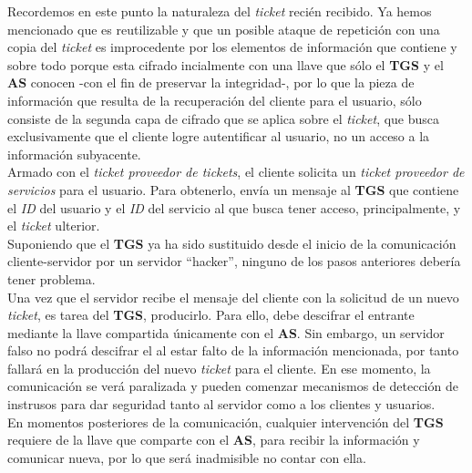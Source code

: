 \documentclass[12pt]{article}
\begin{document}
Recordemos en este punto la naturaleza del \textit{ticket} recién recibido. Ya hemos mencionado que es reutilizable y que un posible ataque de repetición con una copia del \textit{ticket} es improcedente por los elementos de información que contiene y sobre todo porque esta cifrado incialmente con una llave que sólo el \textbf{TGS} y el \textbf{AS} conocen -con el fin de preservar la integridad-, por lo que
la pieza de información que resulta de la recuperación del cliente para el usuario, sólo consiste de
la segunda capa de cifrado que se aplica sobre el \textit{ticket}, que busca exclusivamente que el
cliente logre autentificar al usuario, no un acceso a la información subyacente. \\

Armado con el \textit{ticket proveedor de tickets}, el cliente solicita un \textit{ticket proveedor de servicios} para el usuario. Para obtenerlo, envía un mensaje al \textbf{TGS} que contiene el \textit{ID} del usuario y el \textit{ID} del servicio al que busca tener acceso, principalmente, y el \textit{ticket} ulterior. \\

Suponiendo que el \textbf{TGS} ya ha sido sustituido desde el inicio de la comunicación cliente-servidor por un servidor ``hacker'', ninguno de los pasos anteriores debería tener problema. \\

Una vez que el servidor recibe el mensaje del cliente con la solicitud de un nuevo \textit{ticket}, es
tarea del \textbf{TGS}, producirlo. Para ello, debe descifrar el  entrante mediante
la llave compartida únicamente con el \textbf{AS}. Sin embargo, un servidor falso no podrá descifrar el  al estar falto de la información mencionada, por tanto fallará en la producción del nuevo \textit{ticket} para el cliente. En ese momento, la comunicación se verá paralizada y pueden comenzar mecanismos de detección de instrusos para dar seguridad tanto al servidor como a los clientes y usuarios.\\

En momentos posteriores de la comunicación, cualquier intervención del \textbf{TGS} requiere de la llave que comparte con el \textbf{AS}, para recibir la información y comunicar nueva, por lo que será inadmisible no contar con ella. \\
\end{document}
